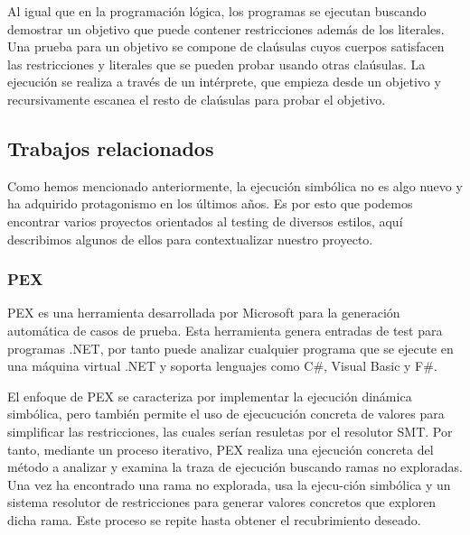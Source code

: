 Al igual que en la programaci\'on l\'ogica, los programas se ejecutan buscando demostrar un objetivo que puede contener restricciones adem\'as de los literales. Una prueba para un objetivo se compone de cla\'usulas cuyos cuerpos satisfacen las restricciones y literales que se pueden probar usando otras cla\'usulas. La ejecuci\'on se realiza a trav\'es de un int\'erprete, que empieza desde un objetivo y recursivamente escanea el resto de cla\'usulas para probar el objetivo.

\subsection{Trabajos relacionados}
\label{ap2:sec:trabajos}

Como hemos mencionado anteriormente, la ejecuci\'on simb\'olica no es algo nuevo y ha adquirido protagonismo en los \'ultimos a\~nos. Es por esto que podemos encontrar varios proyectos orientados al testing de diversos estilos, aqu\'i describimos algunos de ellos para contextualizar nuestro proyecto.

\subsubsection{PEX}
\label{ap25:sec:pex}

PEX es una herramienta desarrollada por Microsoft para la generaci\'on autom\'atica de casos de prueba. Esta herramienta genera entradas de test para programas .NET, por tanto puede analizar cualquier programa que se ejecute en una m\'aquina virtual .NET y soporta lenguajes como C\#, Visual Basic y F\#.

El enfoque de PEX se caracteriza por implementar la ejecuci\'on din\'amica simb\'olica, pero tambi\'en permite el uso de ejecucuci\'on concreta de valores para simplificar las restricciones, las cuales ser\'ian resuletas por el resolutor SMT. Por tanto, mediante un proceso iterativo, PEX realiza una ejecuci\'on concreta del m\'etodo a analizar y examina la traza de ejecuci\'on buscando ramas no exploradas. Una vez ha encontrado una rama no explorada, usa la ejecu-ci\'on simb\'olica y un sistema resolutor de restricciones para generar valores concretos que exploren dicha rama. Este proceso se repite hasta obtener el recubrimiento deseado.

